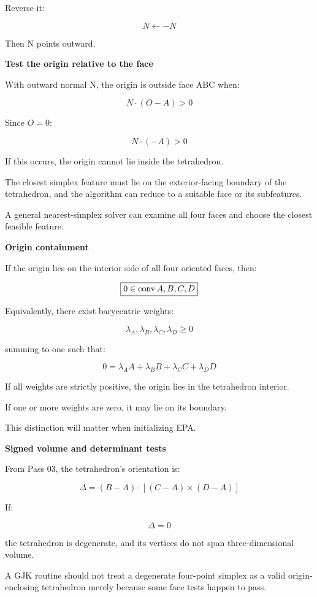 Reverse it:

\[
N\leftarrow-N
\]

Then N points outward.

\textbf{Test the origin relative to the face}

With outward normal N, the origin is outside face ABC when:

\[
N\cdot(O-A)>0
\]

Since \(O=0\):

\[
\boxed{ N\cdot(-A)>0 }
\]

If this occurs, the origin cannot lie inside the tetrahedron.

The closest simplex feature must lie on the exterior-facing boundary of the tetrahedron, and the algorithm can reduce to a suitable face or its subfeatures.

A general nearest-simplex solver can examine all four faces and choose the closest feasible feature.

\textbf{Origin containment}

If the origin lies on the interior side of all four oriented faces, then:

\[
\boxed{ 0\in\operatorname{conv}\\{A,B,C,D\\} }
\]

Equivalently, there exist barycentric weights:

\[
\lambda_A,\lambda_B,\lambda_C,\lambda_D\ge0
\]

summing to one such that:

\[
\boxed{ 0=\lambda_AA+\lambda_BB+\lambda_CC+\lambda_DD }
\]

If all weights are strictly positive, the origin lies in the tetrahedron interior.

If one or more weights are zero, it may lie on its boundary.

This distinction will matter when initializing EPA.

\textbf{Signed volume and determinant tests}

From Pass 03, the tetrahedron's orientation is:

\[
\Delta= (B-A)\cdot[(C-A)\times(D-A)]
\]

If:

\[
\Delta=0
\]

the tetrahedron is degenerate, and its vertices do not span three-dimensional volume.

A GJK routine should not treat a degenerate four-point simplex as a valid origin-enclosing tetrahedron merely because some face tests happen to pass.

